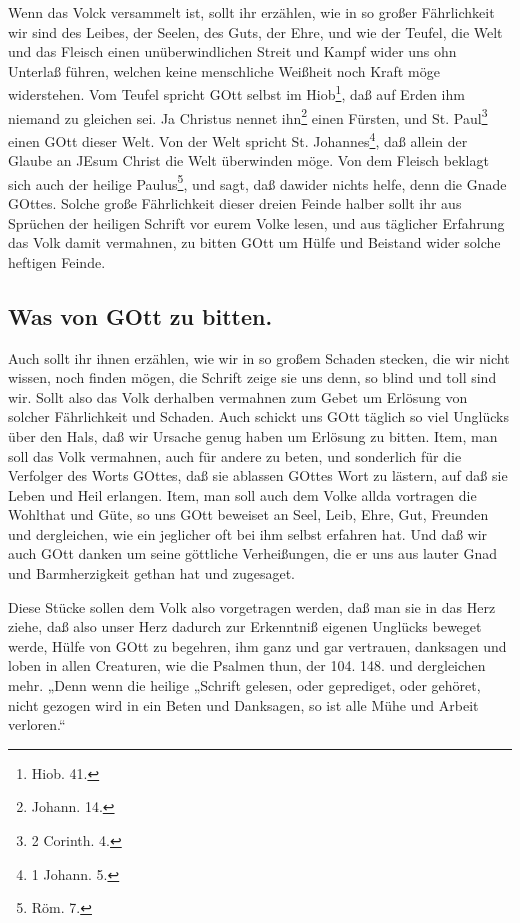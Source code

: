 Wenn das Volck versammelt ist, sollt ihr erzählen, wie in so großer Fährlichkeit wir sind des Leibes, der Seelen, des Guts, der Ehre, und wie der Teufel, die Welt und das Fleisch einen unüberwindlichen Streit und Kampf wider uns ohn Unterlaß führen, welchen keine menschliche Weißheit noch Kraft möge widerstehen. Vom Teufel spricht GOtt selbst im Hiob\footnote{Hiob. 41.}, daß auf Erden ihm niemand zu gleichen sei. Ja Christus nennet ihn\footnote{Johann. 14.} einen Fürsten, und St. Paul\footnote{2 Corinth. 4.} einen GOtt dieser Welt. Von der Welt spricht St. Johannes\footnote{1 Johann. 5.}, daß allein der Glaube an JEsum Christ die Welt überwinden möge. Von dem Fleisch beklagt sich auch der heilige Paulus\footnote{Röm. 7.}, und sagt, daß dawider nichts helfe,
denn die Gnade GOttes. Solche große Fährlichkeit dieser dreien Feinde halber sollt ihr aus Sprüchen der heiligen Schrift vor eurem Volke lesen, und aus täglicher Erfahrung das Volk damit vermahnen, zu bitten GOtt um Hülfe und Beistand wider solche heftigen Feinde.

\subsection*{Was von GOtt zu bitten.}

Auch sollt ihr ihnen erzählen, wie wir in so großem Schaden stecken, die wir nicht wissen, noch finden mögen, die Schrift zeige sie uns denn, so blind und toll sind wir. Sollt also das Volk derhalben vermahnen zum Gebet um Erlösung von solcher Fährlichkeit und Schaden. Auch schickt uns GOtt täglich so viel Unglücks über den Hals, daß wir Ursache genug haben um Erlösung zu bitten. Item, man soll das Volk vermahnen, auch für andere zu beten, und sonderlich für die Verfolger des Worts GOttes, daß sie ablassen GOttes Wort zu lästern, auf daß sie Leben und Heil erlangen. Item, man soll auch dem Volke allda vortragen die Wohlthat und Güte, so uns GOtt beweiset an Seel, Leib, Ehre, Gut, Freunden und dergleichen, wie ein jeglicher oft bei ihm selbst erfahren hat. Und daß wir auch GOtt danken um seine göttliche Verheißungen, die er uns aus lauter Gnad und Barmherzigkeit gethan hat und zugesaget.

Diese Stücke sollen dem Volk also vorgetragen werden, daß man sie in das Herz ziehe, daß also unser Herz dadurch zur Erkenntniß eigenen Unglücks beweget werde, Hülfe von GOtt zu begehren, ihm ganz und gar vertrauen, danksagen und loben in allen Creaturen, wie die Psalmen thun, der 104. 148. und dergleichen mehr. „Denn wenn die heilige „Schrift gelesen, oder geprediget, oder gehöret, nicht gezogen wird in ein Beten und Danksagen, so ist alle Mühe und Arbeit verloren.“

